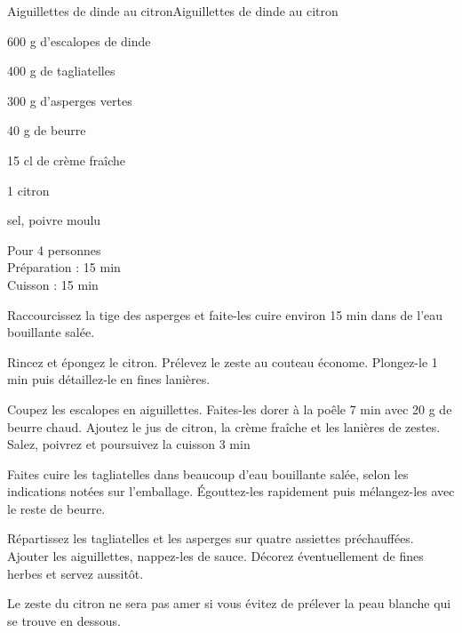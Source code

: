 \begin{recette}{Aiguillettes de dinde au citron}{Aiguillettes de dinde au citron}

\begin{ingredients}
600 g d’escalopes de dinde \par
400 g de tagliatelles\par
300 g d’asperges vertes \par
40 g de beurre\par
15 cl de crème fraîche\par
1 citron\par
sel, poivre moulu\par
\end{ingredients}

\begin{infos}
Pour 4 personnes\\
Préparation : 15 min\\
Cuisson : 15 min\\
\end{infos}

\begin{etapes}
\item Raccourcissez la tige des asperges et faite-les cuire environ 15 min dans de l’eau bouillante salée.
\item Rincez et épongez le citron. Prélevez le zeste au couteau économe. Plongez-le 1 min puis détaillez-le en fines lanières.
\item Coupez les escalopes en aiguillettes. Faites-les dorer à la poêle 7 min avec 20 g de beurre chaud. Ajoutez le jus de citron, la crème fraîche et les lanières de zestes. Salez, poivrez et poursuivez la cuisson 3 min
\item Faites cuire les tagliatelles dans beaucoup d’eau bouillante salée, selon les indications notées sur l’emballage. Égouttez-les rapidement puis mélangez-les avec le reste de beurre.
\item Répartissez les tagliatelles et les asperges sur quatre assiettes préchauffées. Ajouter les aiguillettes, nappez-les de sauce. Décorez éventuellement de fines herbes et servez aussitôt.
\end{etapes}

\begin{conseils}
Le zeste du citron ne sera pas amer si vous évitez de prélever la peau blanche qui se trouve en dessous.
\end{conseils}

\end{recette}